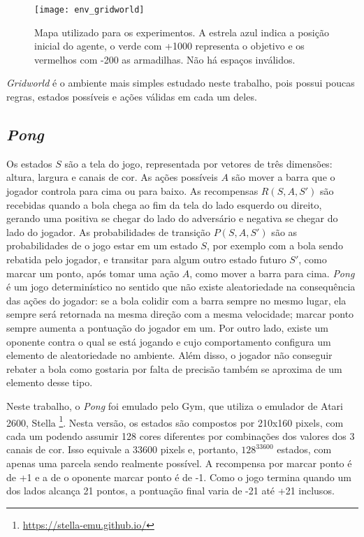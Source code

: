 \begin{figure}[h!]
  \centering
  \texttt{[image: env\_gridworld]}
  \caption{Mapa utilizado para os experimentos. A estrela azul indica a posição inicial do agente, o verde com +1000 representa o objetivo e os vermelhos com -200 as armadilhas. Não há espaços inválidos.}
  \label{fig:env_grid}
\end{figure}

\textit{Gridworld} é o ambiente mais simples estudado neste trabalho, pois possui poucas regras, estados possíveis e ações válidas em cada um deles.

\subsection{\textit{Pong}}
\label{sec:env_pong}

Os estados $S$ são a tela do jogo, representada por vetores de três dimensões: altura, largura e canais de cor.
As ações possíveis $A$ são mover a barra que o jogador controla para cima ou para baixo.
As recompensas $R(S,A,S')$ são recebidas quando a bola chega ao fim da tela do lado esquerdo ou direito, gerando uma positiva se chegar do lado do adversário e negativa se chegar do lado do jogador.
As probabilidades de transição $P(S,A,S')$ são as probabilidades de o jogo estar em um estado $S$, por exemplo com a bola sendo rebatida pelo jogador, e transitar para algum outro estado futuro $S'$, como marcar um ponto, após tomar uma ação $A$, como mover a barra para cima.
\textit{Pong} é um jogo determinístico no sentido que não existe aleatoriedade na consequência das ações do jogador: se a bola colidir com a barra sempre no mesmo lugar, ela sempre será retornada na mesma direção com a mesma velocidade; marcar ponto sempre aumenta a pontuação do jogador em um.
Por outro lado, existe um oponente contra o qual se está jogando e cujo comportamento configura um elemento de aleatoriedade no ambiente.
Além disso, o jogador não conseguir rebater a bola como gostaria por falta de precisão também se aproxima de um elemento desse tipo.

Neste trabalho, o \textit{Pong} foi emulado pelo Gym, que utiliza o emulador de Atari 2600, Stella \footnote{\url{https://stella-emu.github.io/}}.
Nesta versão, os estados são compostos por 210x160 pixels, com cada um podendo assumir 128 cores diferentes por combinações dos valores dos 3 canais de cor.
Isso equivale a 33600 pixels e, portanto, $128^{33600}$ estados, com apenas uma parcela sendo realmente possível.
A recompensa por marcar ponto é de +1 e a de o oponente marcar ponto é de -1.
Como o jogo termina quando um dos lados alcança 21 pontos, a pontuação final varia de -21 até +21 inclusos.

